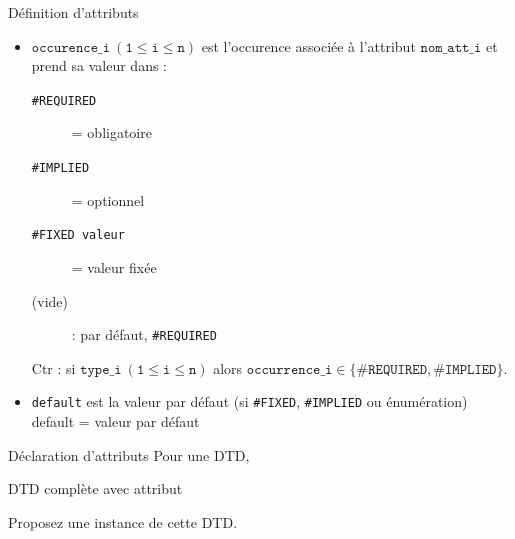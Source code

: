 \begin{frame}{Définition d'attributs}
\begin{itemize}
\item $\mathtt{occurence\_i ~(1 \leq i \leq n)}$ est l'occurence associée à l'attribut $\mathtt{nom\_att\_i}$ et prend sa valeur dans :
  \begin{description}
  \item[\texttt{\#REQUIRED}] = obligatoire 
  \item[\texttt{\#IMPLIED}] = optionnel 
  \item[\texttt{\#FIXED valeur}] = valeur fixée
  \item[(vide)] : par défaut, \texttt{\#REQUIRED}
  \end{description}
Ctr : si $\mathtt{type\_i ~(1 \leq i \leq n)}$ alors $\mathtt{occurrence\_i} \in \{\mathtt{\#REQUIRED}, \mathtt{\#IMPLIED}\}$.
\item \texttt{default} est la valeur par défaut (si \texttt{\#FIXED}, \texttt{\#IMPLIED} ou énumération)
default = valeur par défaut 
\end{itemize}


\end{frame}

\begin{frame}[containsverbatim]{Déclaration d'attributs}
Pour une DTD, 
\end{frame}


\begin{frame}[containsverbatim]{DTD complète avec attribut}




\begin{exoblock}
Proposez une instance de cette DTD.
\end{exoblock}
\end{frame}

